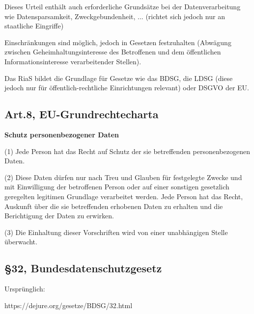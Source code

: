     Dieses Urteil enthält auch erforderliche Grundsätze bei der Datenverarbeitung wie Datensparsamkeit, Zweckgebundenheit, ... (richtet sich jedoch nur an staatliche Eingriffe)
    
    Einschränkungen sind möglich, jedoch in Gesetzen festzuhalten (Abwägung zwischen Geheimhaltungsinteresse des Betroffenen und dem öffentlichen Informationsinteresse verarbeitender Stellen).
    
    Das RiaS bildet die Grundlage für Gesetze wie das BDSG, die LDSG (diese jedoch nur für öffentlich-rechtliche Einrichtungen relevant) oder DSGVO der EU.
    
  \subsection*{Art.8, EU-Grundrechtecharta}
      
      \textbf{Schutz personenbezogener Daten}
      
      (1) Jede Person hat das Recht auf Schutz der sie betreffenden personenbezogenen Daten. 
      
      (2) Diese Daten dürfen nur nach Treu und Glauben für festgelegte Zwecke und mit Einwilligung 
      der betroffenen Person oder auf einer sonstigen gesetzlich geregelten legitimen Grundlage verarbeitet werden. Jede Person hat das Recht, Auskunft über die sie betreffenden erhobenen Daten zu erhalten und die Berichtigung der Daten zu erwirken. 
      
      (3) Die Einhaltung dieser Vorschriften wird von einer unabhängigen Stelle überwacht. 
  
  \subsection*{§32, Bundesdatenschutzgesetz}
  
  Ursprünglich:
   
  https://dejure.org/gesetze/BDSG/32.html
  
